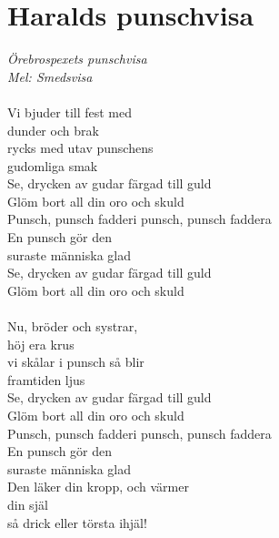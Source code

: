 \documentclass[a5paper,15pt]{article}
\begin{document}
\section{Haralds punschvisa}
\emph{Örebrospexets punschvisa\\
Mel: Smedsvisa}\\
\\
Vi bjuder till fest med \\dunder och brak\\
rycks med utav punschens \\gudomliga smak\\
Se, drycken av gudar färgad till guld\\
Glöm bort all din oro och skuld\\
Punsch, punsch fadderi punsch, punsch faddera\\
En punsch gör den \\suraste människa glad\\
Se, drycken av gudar färgad till guld\\
Glöm bort all din oro och skuld\\
\\
Nu, bröder och systrar, \\höj era krus\\
vi skålar i punsch så blir \\framtiden ljus\\
Se, drycken av gudar färgad till guld\\
Glöm bort all din oro och skuld\\
Punsch, punsch fadderi punsch, punsch faddera\\
En punsch gör den \\suraste människa glad\\
Den läker din kropp, och värmer \\din själ\\
så drick eller törsta ihjäl!
\\
\end{document}
